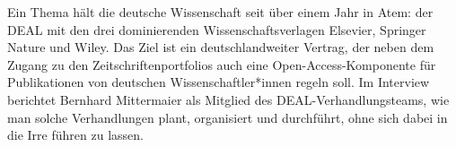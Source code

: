 Ein Thema hält die deutsche Wissenschaft seit über einem Jahr in Atem:
der DEAL mit den drei dominierenden Wissenschaftsverlagen Elsevier,
Springer Nature und Wiley. Das Ziel ist ein deutschlandweiter Vertrag,
der neben dem Zugang zu den Zeitschriftenportfolios auch eine
Open-Access-Komponente für Publikationen von deutschen
Wissenschaftler*innen regeln soll. Im Interview berichtet Bernhard
Mittermaier als Mitglied des DEAL-Verhandlungsteams, wie man solche
Verhandlungen plant, organisiert und durchführt, ohne sich dabei in die
Irre führen zu lassen.
